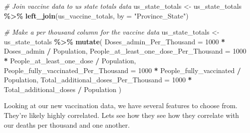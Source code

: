 \documentclass[
]{article}
\newenvironment{Shaded}{\begin{snugshade}}{\end{snugshade}}
\newcommand{\AttributeTok}[1]{\textcolor[rgb]{0.13,0.29,0.53}{#1}}
\newcommand{\CommentTok}[1]{\textcolor[rgb]{0.56,0.35,0.01}{\textit{#1}}}
\newcommand{\DecValTok}[1]{\textcolor[rgb]{0.00,0.00,0.81}{#1}}
\newcommand{\FunctionTok}[1]{\textcolor[rgb]{0.13,0.29,0.53}{\textbf{#1}}}
\newcommand{\NormalTok}[1]{#1}
\newcommand{\OtherTok}[1]{\textcolor[rgb]{0.56,0.35,0.01}{#1}}
\newcommand{\SpecialCharTok}[1]{\textcolor[rgb]{0.81,0.36,0.00}{\textbf{#1}}}
\newcommand{\StringTok}[1]{\textcolor[rgb]{0.31,0.60,0.02}{#1}}
\begin{document}
\begin{Shaded}
\begin{Highlighting}[]
\CommentTok{\# Join vaccine data to us state totals data}
\NormalTok{us\_state\_totals }\OtherTok{\textless{}{-}}\NormalTok{ us\_state\_totals }\SpecialCharTok{\%\textgreater{}\%}
  \FunctionTok{left\_join}\NormalTok{(us\_vaccine\_totals, }\AttributeTok{by =} \StringTok{"Province\_State"}\NormalTok{)}

\CommentTok{\# Make a per thousand column for the vaccine data}
\NormalTok{us\_state\_totals }\OtherTok{\textless{}{-}}\NormalTok{ us\_state\_totals }\SpecialCharTok{\%\textgreater{}\%}
  \FunctionTok{mutate}\NormalTok{(}
    \AttributeTok{Doses\_admin\_Per\_Thousand =} \DecValTok{1000} \SpecialCharTok{*}\NormalTok{ Doses\_admin }\SpecialCharTok{/}\NormalTok{ Population,}
    \AttributeTok{People\_at\_least\_one\_dose\_Per\_Thousand =} \DecValTok{1000} \SpecialCharTok{*}\NormalTok{ People\_at\_least\_one\_dose }\SpecialCharTok{/}\NormalTok{ Population,}
    \AttributeTok{People\_fully\_vaccinated\_Per\_Thousand =} \DecValTok{1000} \SpecialCharTok{*}\NormalTok{ People\_fully\_vaccinated }\SpecialCharTok{/}\NormalTok{ Population,}
    \AttributeTok{Total\_additional\_doses\_Per\_Thousand =} \DecValTok{1000} \SpecialCharTok{*}\NormalTok{ Total\_additional\_doses }\SpecialCharTok{/}\NormalTok{ Population}
\NormalTok{  )}
\end{Highlighting}
\end{Shaded}

Looking at our new vaccination data, we have several features to choose
from. They're likely highly correlated. Lets see how they see how they
correlate with our deaths per thousand and one another.
\end{document}
